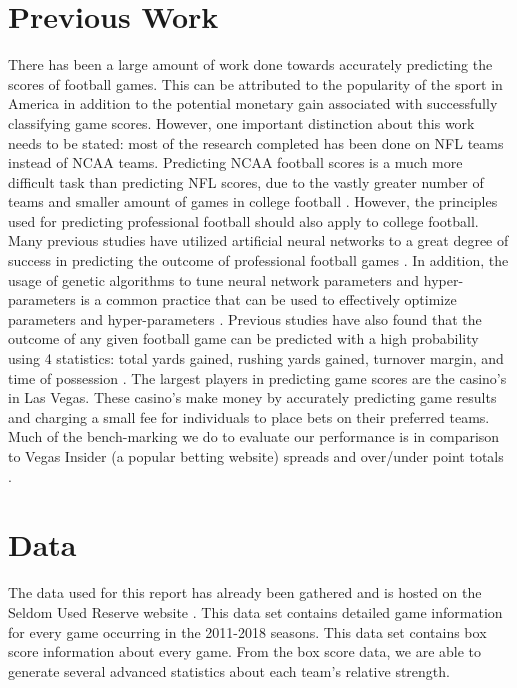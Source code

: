 \documentclass[10pt,twocolumn,letterpaper]{article}
\begin{document}
\section{Previous Work}
There has been a large amount of work done towards accurately predicting the scores of football games.  This can be attributed to the popularity of the sport in America in addition to the potential monetary gain associated with successfully classifying game scores.  However, one important distinction about this work needs to be stated: most of the research completed has been done on NFL teams instead of NCAA teams.  Predicting NCAA football scores is a much more difficult task than predicting NFL scores, due to the vastly greater number of teams and smaller amount of games in college football \cite{blaikie2011nfl}.  However, the principles used for predicting professional football should also apply to college football.  Many previous studies have utilized artificial neural networks to a great degree of success in predicting the outcome of professional football games \cite{blaikie2011nfl,david2011nfl,purucker1996neural}.  In addition, the usage of genetic algorithms to tune neural network parameters and hyper-parameters is a common practice that can be used to effectively optimize parameters and hyper-parameters \cite{bashiri2011tuning}.  Previous studies have also found that the outcome of any given football game can be predicted with a high probability using 4 statistics: total yards gained, rushing yards gained, turnover margin, and time of possession \cite{purucker1996neural}.  The largest players in predicting game scores are the casino's in Las Vegas. These casino's make money by accurately predicting game results and charging a small fee for individuals to place bets on their preferred teams.  Much of the bench-marking we do to evaluate our performance is in comparison to Vegas Insider (a popular betting website) spreads and over/under point totals \cite{vegas}.

\section{Data}
The data used for this report has already been gathered and is hosted on the Seldom Used Reserve website \cite{SeldomUsedReserve}.  This data set contains detailed game information for every game occurring in the 2011-2018 seasons.  This data set contains box score information about every game.  From the box score data, we are able to generate several advanced statistics about each team's relative strength.
\end{document}
